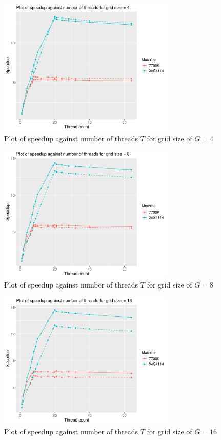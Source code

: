 \documentclass[12pt]{article}
\begin{document}
\begin{figure}[H]
    \centering
    \includegraphics[width=0.75\textwidth]{optPar-gridSize4-speedup}
    \caption{Plot of speedup against number of threads $T$ for grid size of $G = 4$}
    \label{fig:optPar-gridSize4-speedup}
\end{figure}
\begin{figure}[H]
    \centering
    \includegraphics[width=0.75\textwidth]{optPar-gridSize8-speedup}
    \caption{Plot of speedup against number of threads $T$ for grid size of $G = 8$}
    \label{fig:optPar-gridSize8-speedup}
\end{figure}
\begin{figure}[H]
    \centering
    \includegraphics[width=0.75\textwidth]{optPar-gridSize16-speedup}
    \caption{Plot of speedup against number of threads $T$ for grid size of $G = 16$}
    \label{fig:optPar-gridSize16-speedup}
\end{figure}
\end{document}
